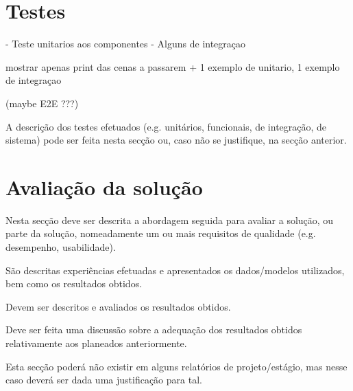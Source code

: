 \section{Testes} 

- Teste unitarios aos componentes
- Alguns de integraçao

mostrar apenas print das cenas a passarem + 1 exemplo de unitario, 1 exemplo de integraçao

(maybe E2E ???)

A descrição dos testes efetuados (e.g. unitários, funcionais, de integração, de sistema) pode ser feita nesta secção ou, caso não se justifique, na secção anterior.

\section{Avaliação da solução} 

Nesta secção deve ser descrita a abordagem seguida para avaliar a solução, ou parte da solução, nomeadamente um ou mais requisitos de qualidade (e.g. desempenho, usabilidade). 

São descritas experiências efetuadas e apresentados os dados/modelos utilizados, bem como os resultados obtidos. 

Devem ser descritos e avaliados os resultados obtidos. 

Deve ser feita uma discussão sobre a adequação dos resultados obtidos relativamente aos planeados anteriormente. 

Esta secção poderá não existir em alguns relatórios de projeto/estágio, mas nesse caso deverá ser dada uma justificação para tal. 
